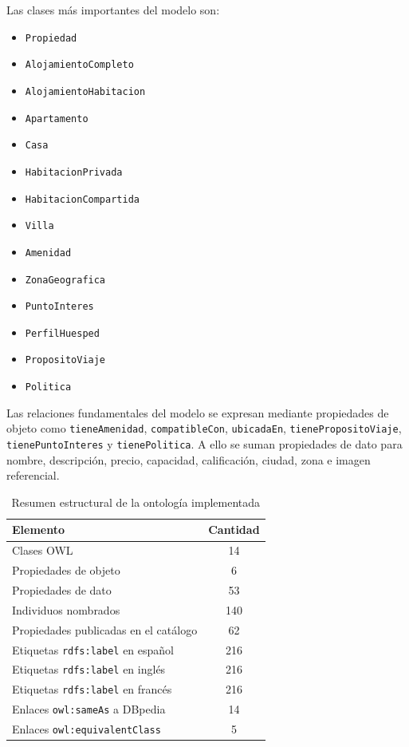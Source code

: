 Las clases más importantes del modelo son:

\begin{itemize}
  \item \texttt{Propiedad}
  \item \texttt{AlojamientoCompleto}
  \item \texttt{AlojamientoHabitacion}
  \item \texttt{Apartamento}
  \item \texttt{Casa}
  \item \texttt{HabitacionPrivada}
  \item \texttt{HabitacionCompartida}
  \item \texttt{Villa}
  \item \texttt{Amenidad}
  \item \texttt{ZonaGeografica}
  \item \texttt{PuntoInteres}
  \item \texttt{PerfilHuesped}
  \item \texttt{PropositoViaje}
  \item \texttt{Politica}
\end{itemize}

Las relaciones fundamentales del modelo se expresan mediante propiedades de objeto como
\texttt{tieneAmenidad}, \texttt{compatibleCon}, \texttt{ubicadaEn},
\texttt{tienePropositoViaje}, \texttt{tienePuntoInteres} y \texttt{tienePolitica}. A
ello se suman propiedades de dato para nombre, descripción, precio, capacidad,
calificación, ciudad, zona e imagen referencial.

\begin{table}[H]
\centering
\caption{Resumen estructural de la ontología implementada}
\begin{tabular}{|p{7cm}|c|}
\hline
\textbf{Elemento} & \textbf{Cantidad} \\
\hline
Clases OWL & 14 \\
\hline
Propiedades de objeto & 6 \\
\hline
Propiedades de dato & 53 \\
\hline
Individuos nombrados & 140 \\
\hline
Propiedades publicadas en el catálogo & 62 \\
\hline
Etiquetas \texttt{rdfs:label} en español & 216 \\
\hline
Etiquetas \texttt{rdfs:label} en inglés & 216 \\
\hline
Etiquetas \texttt{rdfs:label} en francés & 216 \\
\hline
Enlaces \texttt{owl:sameAs} a DBpedia & 14 \\
\hline
Enlaces \texttt{owl:equivalentClass} & 5 \\
\hline
\end{tabular}
\end{table}

